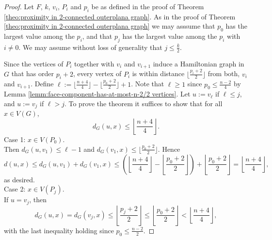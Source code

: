 \documentclass[a4paper,11pt]{article}
\numberwithin{equation}{theorem}
\begin{document}
\begin{proof}              
Let $F$, $k$, $v_i$, $P_i$ and $p_i$ be as defined in the proof of 
Theorem \ref{theo:proximity in 2-connected outerplana graph}.
As in the proof of Theorem \ref{theo:proximity in 2-connected outerplana graph} we may asssume 
that $p_0$ has the largest value 
among the $p_i$, and that $p_j$ has the largest value among the $p_i$ with $i \neq 0$. 
We may assume without loss of generality that $j \leq \frac{k}{2}$.

Since the vertices of $P_i$ together with $v_i$ and $v_{i+1}$ induce a Hamiltonian graph in 
$G$ that has order $p_i+2$,  every vertex of $P_i$ is within distance 
$\lfloor \frac{p_i+2}{2} \rfloor$ from both, $v_i$ and $v_{i+1}$. Define 
$ \ell := \lfloor \frac{n+4}{4} \rfloor - \lfloor \frac{p_0+2}{2} \rfloor+ 1$. 
Note that $\ell \geq 1$ since $p_0 \leq \frac{n-2}{4}$ by 
Lemma \ref{lemm:face-component-has-at-most-n-2/2 vertices}.
Let $u:=v_{\ell}$ if $\ell \leq j$, and $u:=v_j$ if $\ell >j$.
To prove the theorem it suffices to show that for all $x \in V(G)$, 
\begin{equation}
d_G(u, x) \leq \left\lfloor \frac{n+4}{4} \right\rfloor.
\end{equation}  
{\sc Case 1:} $x \in V(P_0)$. \\
Then $d_G(u,v_1) \leq \ell-1$ and $d_G(v_1,x) \leq \lfloor \frac{p_0+2}{2} \rfloor$. Hence
\[ d(u,x) \leq d_G(u,v_1) + d_G(v_1, x) 
\leq \left(\left\lfloor \frac{n+4}{4} \right\rfloor - \left\lfloor \frac{p_0+2}{2} \right\rfloor \right) + \left\lfloor \frac{p_0+2}{2} \right\rfloor
= \left\lfloor \frac{n+4}{4} \right\rfloor, \]
as desired.\\[1mm]
{\sc Case 2:}  $x \in V(P_j)$. \\
If $u=v_j$, then 
\[ d_G(u,x) = d_G(v_j,x) \leq \left\lfloor \frac{p_j+2}{2} \right\rfloor 
   \leq  \left\lfloor \frac{p_0+2}{2} \right\rfloor
   <  \left\lfloor \frac{n+4}{4} \right\rfloor, \]
with the last inequality holding since $p_0 \leq \frac{n-2}{2}$. 


\end{proof}
\end{document}

